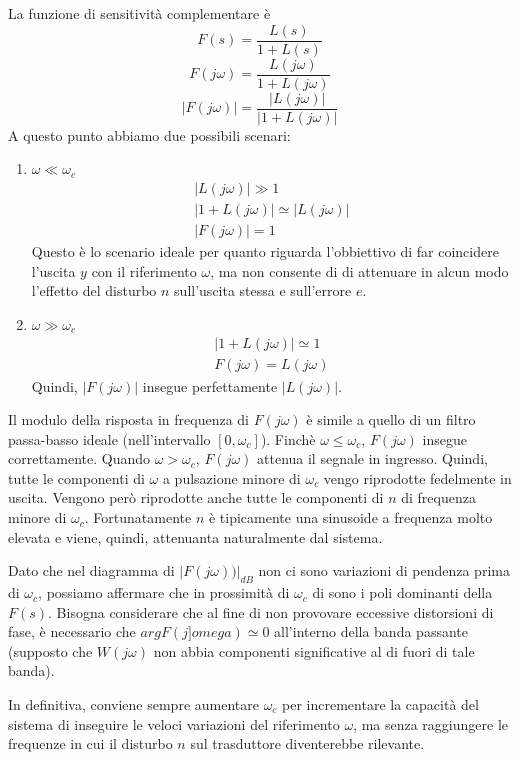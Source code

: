 \documentclass[a4paper]{report}
\begin{document}
La funzione di sensitivit\`a complementare \`e
\[
F(s) = \dfrac{L(s)}{1 + L(s)}
\]
\[
F(j \omega) = \dfrac{L(j \omega)}{1 + L(j \omega)}
\]
\[
|F(j \omega)| = \dfrac{|L(j \omega)|}{|1 + L(j \omega)|}
\]
A questo punto abbiamo due possibili scenari:\begin{enumerate}
\item $\omega \ll \omega_c$
  \[
  \begin{array}{l}
    |L(j \omega)| \gg 1\\
    |1 + L(j \omega)| \simeq |L(j \omega)|\\
    |F(j \omega)| = 1
  \end{array}
  \]
  Questo \`e lo scenario ideale per quanto riguarda l'obbiettivo di far
  coincidere l'uscita $y$ con il riferimento $\omega$, ma non consente
  di di attenuare in alcun modo l'effetto del disturbo $n$ sull'uscita
  stessa e sull'errore $e$.
\item $\omega \gg \omega_c$
  \[
  \begin{array}{l}
    |1 + L(j \omega)| \simeq 1\\
    F(j \omega) = L(j \omega)
  \end{array}
  \]
  Quindi, $|F(j \omega)|$ insegue perfettamente $|L(j \omega)|$.
\end{enumerate}
Il modulo della risposta in frequenza di $F(j \omega)$ \`e simile a
quello di un filtro passa-basso ideale (nell'intervallo $[0,
\omega_c]$). Finch\`e $\omega \leq \omega_c$, $F(j
\omega)$ insegue correttamente. Quando $\omega > \omega_c$, $F(j
\omega)$ attenua il segnale in ingresso. Quindi, tutte le componenti
di $\omega$ a pulsazione minore di $\omega_c$ vengo riprodotte
fedelmente in uscita. Vengono per\`o riprodotte anche tutte le
componenti di $n$ di frequenza minore di $\omega_c$. Fortunatamente
$n$ \`e tipicamente una sinusoide a frequenza molto elevata e viene,
quindi, attenuanta naturalmente dal sistema.

Dato che nel diagramma di $|F(j \omega))|_{dB}$ non ci sono variazioni
di pendenza prima di $\omega_c$, possiamo affermare che in
prossimit\`a di $\omega_c$ di sono i poli dominanti della
$F(s)$. Bisogna considerare che al fine di non provovare eccessive
distorsioni di fase, \`e necessario che $arg F(j ]omega) \simeq 0$
all'interno della banda passante (supposto che $W(j \omega)$ non
abbia componenti significative al di fuori di tale banda).
  
In definitiva, conviene sempre aumentare $\omega_c$ per incrementare
la capacit\`a del sistema di inseguire le veloci variazioni del
riferimento $\omega$, ma senza raggiungere le frequenze in cui il
disturbo $n$ sul trasduttore diventerebbe rilevante.
\end{document}
